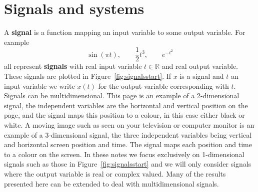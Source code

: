 \documentclass[11pt,a4paper]{book}
\title{\mytitle}
\author{Robby McKilliam}
\theoremstyle{plain}
\numberwithin{equation}{section}
\newcommand{\reals}{{\mathbb R}}
\newcommand{\term}{\textbf}
\newcounter{test}
\begin{document}
\frontmatter
\pagestyle{front}
\maketitle

\setcounter{tocdepth}{1}
\tableofcontents


  
\mainmatter
\pagestyle{main}

\chapter{Signals and systems}

A \term{signal} is a function mapping an input variable to some output variable.  For example
\[
\sin( \pi t), \qquad \frac{1}{2} t^3, \qquad e^{-t^2}
\]
all represent \term{signals} with real input variable $t \in \reals$ and real output variable. These signals are plotted in Figure~\ref{fig:signalsstart}.  If $x$ is a signal and $t$ an input variable we write $x(t)$ for the output variable corresponding with $t$.  Signals can be multidimensional.  This page is an example of a 2-dimensional signal, the independent variables are the horizontal and vertical position on the page, and the signal maps this position to a colour, in this case either black or white.  A moving image such as seen on your television or computer monitor is an example of a 3-dimensional signal, the three independent variables being vertical and horizontal screen position and time.  The signal maps each position and time to a colour on the screen.  %
In these notes we focus exclusively on 1-dimensional signals such as those in Figure~\ref{fig:signalsstart} and we will only consider signals where the output variable is real or complex valued.  Many of the results presented here can be extended to deal with multidimensional signals.
\end{document}
